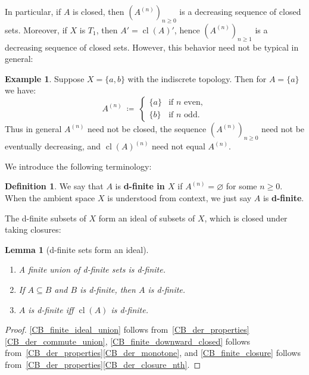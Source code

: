 \documentclass[11pt]{amsart}
\theoremstyle{plain}
\newtheorem{lemma}[thm]{Lemma}
\theoremstyle{definition}
\newtheorem{definition}[thm]{Definition}
\newtheorem{example}[thm]{Example}
\numberwithin{equation}{section}
\newcommand\0{\varnothing}
\DeclareMathOperator\cl{cl}
\begin{document}
\noindent
In particular, if $A$ is closed, then  $(A^{(n)})_{n\geq 0}$ is a decreasing sequence of closed sets. Moreover, if $X$ is $T_1$, then $A'=\cl(A)'$, hence $(A^{(n)})_{n\geq 1}$ is a decreasing sequence of closed sets. However, this behavior need not be typical in general:

\begin{example}Suppose $X=\{a,b\}$ with the indiscrete topology. Then for $A=\{a\}$ we have:
\[
A^{(n)} \ \coloneqq \ \begin{cases}
\{a\} & \text{if $n$ even}, \\
\{b\} & \text{if $n$ odd}.
\end{cases}
\]
Thus in general $A^{(n)}$ need not be closed, the sequence $(A^{(n)})_{n\geq 0}$ need not be eventually decreasing, and $\operatorname{cl}(A)^{(n)}$ need not equal $A^{(n)}$.
\end{example}
\noindent
We introduce the following terminology:

\begin{definition}
We say that $A$ is \textbf{d-finite in $X$} if $A^{(n)}=\varnothing$ for some $n\geq 0$. When the ambient space $X$ is understood from context, we just say $A$ is \textbf{d-finite}.
\end{definition}

\noindent
The d-finite subsets of $X$ form an ideal of subsets of $X$, which is closed under taking closures:

\begin{lemma}[d-finite sets form an ideal]\label{CB_small_ideal_properties}
\hfill\begin{enumerate}
\item\label{CB_finite_ideal_union} A finite union of d-finite sets is d-finite.
\item\label{CB_finite_downward_closed} If $A\subseteq B$ and $B$ is d-finite, then $A$ is d-finite.
\item\label{CB_finite_closure} $A$ is d-finite iff $\operatorname{cl}(A)$ is d-finite.
\end{enumerate}
\end{lemma}
\begin{proof}
\eqref{CB_finite_ideal_union} follows from~\ref{CB_der_properties}\eqref{CB_der_commute_union}, \eqref{CB_finite_downward_closed} follows from~\ref{CB_der_properties}\eqref{CB_der_monotone}, and \eqref{CB_finite_closure} follows from~\ref{CB_der_properties}\eqref{CB_der_closure_nth}.
\end{proof}
\end{document}
